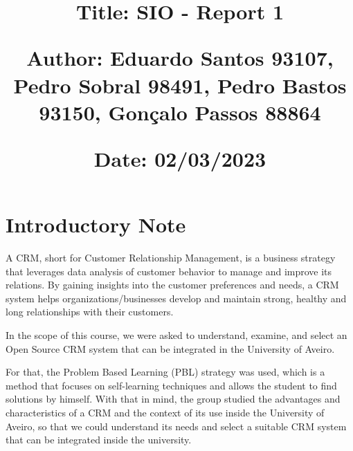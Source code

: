 \documentclass{article}
\begin{document}
\title{\vspace{-0.9cm}
       \vspace{1cm}
       \normalsize
       \raggedright\textbf{Title: \hspace{1.5cm} SIO - Report 1} \\ \vspace{0.4cm}
       \raggedright\textbf{Author: \hspace{1.12cm} Eduardo Santos 93107, Pedro Sobral 98491, Pedro Bastos 93150, Gonçalo Passos 88864} \\ \vspace{0.4cm}
       \raggedright\textbf{Date: \hspace{1.48cm} 02/03/2023} \\}
\author{}
\date{}

\maketitle
\thispagestyle{fancy}


\vspace{-1.4cm}

\tableofcontents


\fontsize{10pt}{13pt}
\selectfont
\lsstyle



\section{Introductory Note}

A CRM, short for Customer Relationship Management, is a business strategy that leverages data analysis of customer behavior to manage and improve its relations. By gaining insights into the customer preferences and needs, a CRM system helps organizations/businesses develop and maintain strong, healthy and long relationships with their customers.

In the scope of this course, we were asked to understand, examine, and select an Open Source CRM system that can be integrated in the University of Aveiro.

For that, the Problem Based Learning (PBL) strategy was used, which is a method that focuses on self-learning techniques and allows the student to find solutions by himself. With that in mind, the group studied the advantages and characteristics of a CRM and the context of its use inside the University of Aveiro, so that we could understand its needs and select a suitable CRM system that can be integrated inside the university.
\end{document}
